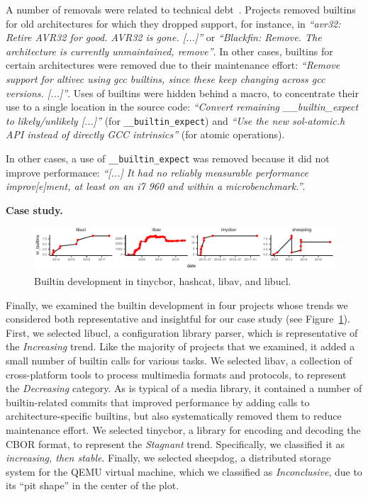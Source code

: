 \documentclass[sigconf,screen]{acmart}
\renewcommand{\paragraph}[1]{\textbf{#1}}
\newcommand\code[1]{\texttt{#1}}
\newcommand\quotecommit[1]{\emph{``#1''}}
\begin{document}
A number of removals were related to technical debt~\cite{Cunningham1993}.
Projects removed builtins for old architectures for which they dropped support, for instance, in \quotecommit{avr32: Retire AVR32 for good. AVR32 is gone. [...]}
or \quotecommit{Blackfin: Remove. The architecture is currently unmaintained, remove}.
In other cases, builtins for certain architectures were removed due to their maintenance effort: \quotecommit{Remove support for altivec using gcc builtins, since these keep changing across gcc versions. [...]}.
Uses of builtins were hidden behind a macro, to concentrate their use to a single location in the source code: \quotecommit{Convert remaining \_\_builtin\_expect to likely/unlikely [...]}
(for \code{\_\_builtin\_expect}) and \quotecommit{Use the new sol-atomic.h API instead of directly GCC intrinsics} (for atomic operations).

In other cases, a use of \code{\_\_builtin\_expect} was removed because it did not improve performance: \quotecommit{[...] It had no reliably measurable performance improv[e]ment, at least on an i7 960 and within a microbenchmark.}.

\paragraph{Case study.}
\begin{figure}[tb]
    \centering
    \includegraphics{../generated/plots/fourplots.pdf}
    \caption{Builtin development in tinycbor, hashcat, libav, and libucl.}
    \label{trends}
\end{figure}
Finally, we examined the builtin development in four projects whose trends we considered both representative and insightful for our case study (see Figure~\ref{trends}).
First, we selected libucl, a configuration library parser, which is representative of the \emph{Increasing} trend.
Like the majority of projects that we examined, it added a small number of builtin calls for various tasks.
We selected libav, a collection of cross-platform tools to process multimedia formats and protocols, to represent the \emph{Decreasing} category.
As is typical of a media library, it contained a number of builtin-related commits that improved performance by adding calls to architecture-specific builtins, but also systematically removed them to reduce maintenance effort.
We selected tinycbor, a library for encoding and decoding the CBOR format, to represent the \emph{Stagnant} trend.
Specifically, we classified it as \emph{increasing, then stable}.
Finally, we selected sheepdog, a distributed storage system for the QEMU virtual machine, which we classified as \emph{Inconclusive}, due to its ``pit shape'' in the center of the plot.
\end{document}
